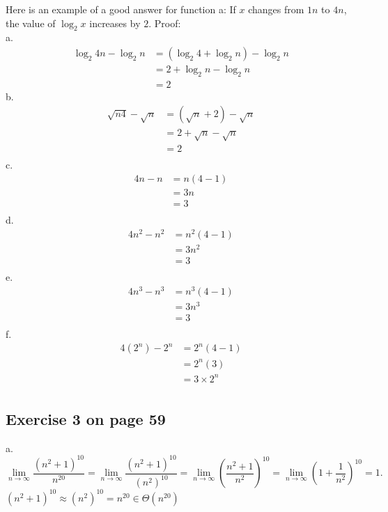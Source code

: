 \documentclass[12pt]{amsart}
\begin{document}
  Here is an example of a good answer for function a:
  If $x$ changes from $1n$ to $4n$, the value of $\log_2 x$ increases by $2$.
  Proof:\\
a.
 \begin{align*}  
 \log_2 4n - \log_2 n &= (\log_2 4 + \log_2 n) - \log_2 n \\
 		&= 2 + \log_2 n - \log_2 n \\
 		&= 2
\end{align*}
b.
\begin{align*}
\sqrt{n4} - \sqrt{n} &= (\sqrt{n} + 2) - \sqrt{n} \\
& = 2 + \sqrt{n} - \sqrt{n} \\
& = 2 \\
\end{align*}
c.
\begin{align*}
4n - n &= n(4 - 1) \\
& = 3n \\
& = 3 \\
\end{align*}
d.
\begin{align*}
4n^2 - n^2 &= n^2(4 - 1) \\
& = 3n^2 \\
& = 3 \\
\end{align*}
e.
\begin{align*}
4n^3 - n^3 &= n^3(4 - 1) \\
& = 3n^3 \\
& = 3 \\
\end{align*}
f.
\begin{align*}
4(2^n) - 2^n &= 2^n(4 - 1) \\
& =  2^n (3)\\
& = 3 \times 2^n\\
\end{align*}

\subsection{Exercise 3 on page 59} $ $\\ 

a.
\[ \lim_{n \rightarrow \infty} \frac{(n^2 + 1)^{10}}{n^{20}} =
   \lim_{n \rightarrow \infty} \frac{(n^2 + 1)^{10}}{(n^2)^{10}} =
   \lim_{n \rightarrow \infty} \left( \frac{n^2 + 1}{n^2} \right)^{10} =
   \lim_{n \rightarrow \infty} \left( 1 + \frac{1}{n^2} \right)^{10} = 1.
\]
$(n^2 + 1)^{10} \approx (n^2)^{10} = n^{20} \in \Theta(n^{20})$\\
\end{document}
